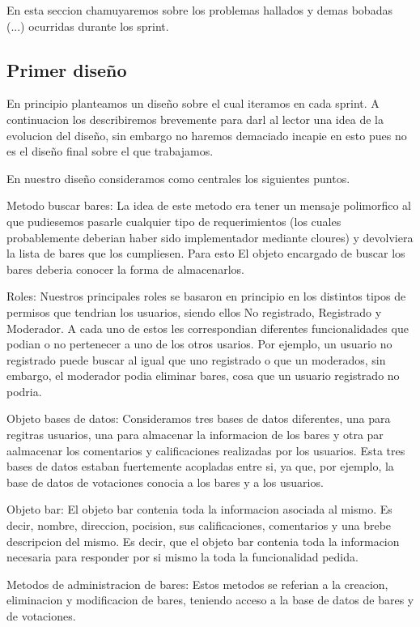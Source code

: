 En esta seccion chamuyaremos sobre los problemas hallados y demas bobadas (...) ocurridas durante los sprint.

\subsection{Primer diseño}

En principio planteamos un diseño sobre el cual iteramos en cada sprint. A continuacion los describiremos brevemente para darl al lector una idea de la evolucion del diseño, sin embargo
no haremos demaciado incapie en esto pues no es el diseño final sobre el que trabajamos.

En nuestro diseño consideramos como centrales los siguientes puntos. 

Metodo buscar bares: La idea de este metodo era tener un mensaje polimorfico al que pudiesemos pasarle cualquier tipo de
requerimientos (los cuales probablemente deberian haber sido implementador mediante cloures) y devolviera la lista de bares que los cumpliesen. Para esto El objeto encargado 
de buscar los bares deberia conocer la forma de almacenarlos.

Roles: Nuestros principales roles se basaron en principio en los distintos tipos de permisos que tendrian los usuarios, siendo ellos No registrado, Registrado y Moderador. A cada 
uno de estos les correspondian diferentes funcionalidades que podian o no pertenecer a uno de los otros usarios. Por ejemplo, un usuario no registrado puede buscar al igual que uno registrado
o que un moderados, sin embargo, el moderador podia eliminar bares, cosa que un usuario registrado no podria.

Objeto bases de datos: Consideramos tres bases de datos diferentes, una para regitras usuarios, una para almacenar la informacion de los bares y otra par aalmacenar los comentarios y calificaciones
realizadas por los usuarios. Esta tres bases de datos estaban fuertemente acopladas entre si, ya que, por ejemplo, la base de datos de votaciones conocia a los bares y a los usuarios.

Objeto bar: El objeto bar contenia toda la informacion asociada al mismo. Es decir, nombre, direccion, pocision, sus calificaciones, comentarios y una brebe descripcion del mismo. Es 
decir, que el objeto bar contenia toda la informacion necesaria para responder por si mismo la toda la funcionalidad pedida. 

Metodos de administracion de bares: Estos metodos se referian a la creacion, eliminacion y modificacion de bares, teniendo acceso a la base de datos de bares y de votaciones.



